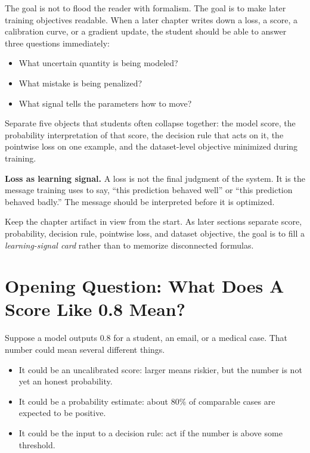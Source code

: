 The goal is not to flood the reader with formalism. The goal is to make later training objectives readable. When a later chapter writes down a loss, a score, a calibration curve, or a gradient update, the student should be able to answer three questions immediately:

\begin{itemize}[leftmargin=*]
\item What uncertain quantity is being modeled?
\item What mistake is being penalized?
\item What signal tells the parameters how to move?
\end{itemize}

\begin{problemsolvinglens}
Separate five objects that students often collapse together: the model score, the probability interpretation of that score, the decision rule that acts on it, the pointwise loss on one example, and the dataset-level objective minimized during training.
\end{problemsolvinglens}

\begin{thinkingtool}
\textbf{Loss as learning signal.} A loss is not the final judgment of the system. It is the message training uses to say, ``this prediction behaved well'' or ``this prediction behaved badly.'' The message should be interpreted before it is optimized.
\end{thinkingtool}

Keep the chapter artifact in view from the start. As later sections separate score, probability, decision rule, pointwise loss, and dataset objective, the goal is to fill a \emph{learning-signal card} rather than to memorize disconnected formulas.

\section*{Opening Question: What Does A Score Like 0.8 Mean?}

Suppose a model outputs \(0.8\) for a student, an email, or a medical case. That number could mean several different things.

\begin{itemize}[leftmargin=*]
\item It could be an uncalibrated score: larger means riskier, but the number is not yet an honest probability.
\item It could be a probability estimate: about \(80\%\) of comparable cases are expected to be positive.
\item It could be the input to a decision rule: act if the number is above some threshold.
\end{itemize}

